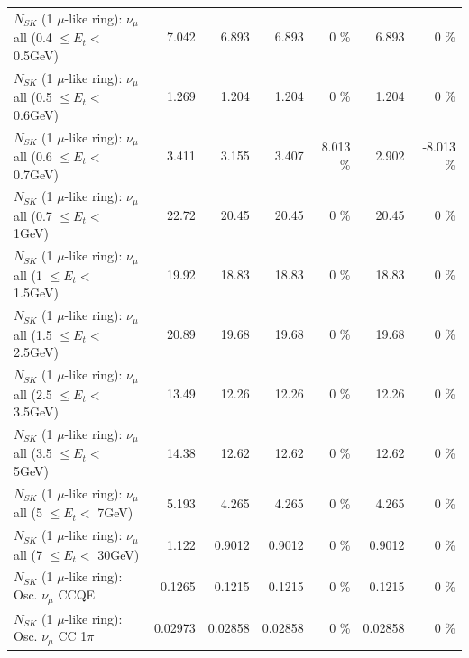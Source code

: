 \begin{table}
\begin{tabular}{| l | r | r | r  r | r  r |}
       $N_{SK}$ (1 $\mu$-like ring): $\nu_{\mu}$ all (0.4 $\leq E_{t} <$ 0.5GeV) &           7.042 &           6.893 &           6.893 &        0 \%  &           6.893 &        0 \%  \\ 
       $N_{SK}$ (1 $\mu$-like ring): $\nu_{\mu}$ all (0.5 $\leq E_{t} <$ 0.6GeV) &           1.269 &           1.204 &           1.204 &        0 \%  &           1.204 &        0 \%  \\ 
       $N_{SK}$ (1 $\mu$-like ring): $\nu_{\mu}$ all (0.6 $\leq E_{t} <$ 0.7GeV) &           3.411 &           3.155 &           3.407 &    8.013 \%  &           2.902 &   -8.013 \%  \\ 
         $N_{SK}$ (1 $\mu$-like ring): $\nu_{\mu}$ all (0.7 $\leq E_{t} <$ 1GeV) &           22.72 &           20.45 &           20.45 &        0 \%  &           20.45 &        0 \%  \\ 
         $N_{SK}$ (1 $\mu$-like ring): $\nu_{\mu}$ all (1 $\leq E_{t} <$ 1.5GeV) &           19.92 &           18.83 &           18.83 &        0 \%  &           18.83 &        0 \%  \\ 
       $N_{SK}$ (1 $\mu$-like ring): $\nu_{\mu}$ all (1.5 $\leq E_{t} <$ 2.5GeV) &           20.89 &           19.68 &           19.68 &        0 \%  &           19.68 &        0 \%  \\ 
       $N_{SK}$ (1 $\mu$-like ring): $\nu_{\mu}$ all (2.5 $\leq E_{t} <$ 3.5GeV) &           13.49 &           12.26 &           12.26 &        0 \%  &           12.26 &        0 \%  \\ 
         $N_{SK}$ (1 $\mu$-like ring): $\nu_{\mu}$ all (3.5 $\leq E_{t} <$ 5GeV) &           14.38 &           12.62 &           12.62 &        0 \%  &           12.62 &        0 \%  \\ 
           $N_{SK}$ (1 $\mu$-like ring): $\nu_{\mu}$ all (5 $\leq E_{t} <$ 7GeV) &           5.193 &           4.265 &           4.265 &        0 \%  &           4.265 &        0 \%  \\ 
          $N_{SK}$ (1 $\mu$-like ring): $\nu_{\mu}$ all (7 $\leq E_{t} <$ 30GeV) &           1.122 &          0.9012 &          0.9012 &        0 \%  &          0.9012 &        0 \%  \\ 
\hline
\hline
                               $N_{SK}$ (1 $\mu$-like ring): Osc. $\nu_\mu$ CCQE &          0.1265 &          0.1215 &          0.1215 &        0 \%  &          0.1215 &        0 \%  \\ 
                          $N_{SK}$ (1 $\mu$-like ring): Osc. $\nu_\mu$ CC 1$\pi$ &         0.02973 &         0.02858 &         0.02858 &        0 \%  &         0.02858 &        0 \%  \\ 

\end{tabular}
\end{table}
